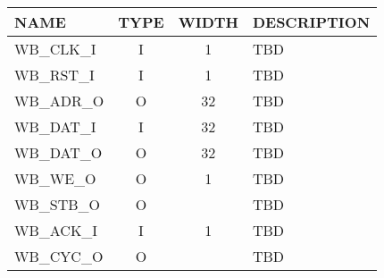 {
\footnotesize
\begin{tabularx}{0.9\textwidth}{|l|c|c|X|}
  \hline
  \cellcolor{gray!20}\textbf{NAME} & \cellcolor{gray!20}\textbf{TYPE} & \cellcolor{gray!20}\textbf{WIDTH} & \cellcolor{gray!20}\textbf{DESCRIPTION} \\
  \hline
  WB\_CLK\_I & I & 1 & TBD \\
  \hline
  WB\_RST\_I & I & 1 & TBD \\
  \hline
  WB\_ADR\_O & O & 32 & TBD \\
  \hline
  WB\_DAT\_I & I & 32 & TBD \\
  \hline
  WB\_DAT\_O & O & 32 & TBD \\
  \hline
  WB\_WE\_O & O & 1 & TBD \\
  \hline
  WB\_STB\_O & O &  & TBD \\
  \hline
  WB\_ACK\_I & I & 1 & TBD \\
  \hline
  WB\_CYC\_O & O &  & TBD \\
  \hline
\end{tabularx}
}
